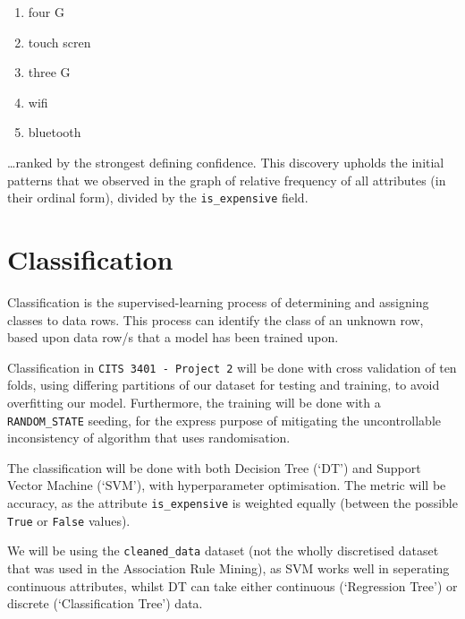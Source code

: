 \documentclass[11pt]{article}
\providecommand{\tightlist}{%
      \setlength{\itemsep}{0pt}\setlength{\parskip}{0pt}}
\begin{document}
\begin{enumerate}
\def\labelenumi{\arabic{enumi}.}
\tightlist
\item
  four G
\item
  touch scren
\item
  three G
\item
  wifi
\item
  bluetooth
\end{enumerate}

\ldots ranked by the strongest defining confidence. This discovery
upholds the initial patterns that we observed in the graph of relative
frequency of all attributes (in their ordinal form), divided by the
\texttt{is\_expensive} field.

    \hypertarget{classification}{%
\section{Classification}\label{classification}}

Classification is the supervised-learning process of determining and
assigning classes to data rows. This process can identify the class of
an unknown row, based upon data row/s that a model has been trained
upon.

Classification in \texttt{CITS\ 3401\ -\ Project\ 2} will be done with
cross validation of ten folds, using differing partitions of our dataset
for testing and training, to avoid overfitting our model. Furthermore,
the training will be done with a \texttt{RANDOM\_STATE} seeding, for the
express purpose of mitigating the uncontrollable inconsistency of
algorithm that uses randomisation.

The classification will be done with both Decision Tree (`DT') and
Support Vector Machine (`SVM'), with hyperparameter optimisation. The
metric will be accuracy, as the attribute \texttt{is\_expensive} is
weighted equally (between the possible \texttt{True} or \texttt{False}
values).

We will be using the \texttt{cleaned\_data} dataset (not the wholly
discretised dataset that was used in the Association Rule Mining), as
SVM works well in seperating continuous attributes, whilst DT can take
either continuous (`Regression Tree') or discrete (`Classification
Tree') data.
\end{document}
